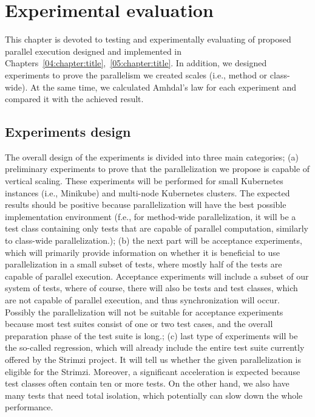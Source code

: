 \chapter{Experimental evaluation}
\label{06:chapter:title}

This chapter is devoted to testing and experimentally evaluating of proposed parallel execution designed and implemented in
Chapters~\ref{04:chapter:title},~\ref{05:chapter:title}.
In addition, we designed experiments to prove the parallelism we created scales (i.e., method or class-wide).
At the same time, we calculated Amhdal's law for each experiment and compared it with the achieved result.

\section{Experiments design}

The overall design of the experiments is divided into three main categories;
(a) preliminary experiments to prove that the parallelization we propose is capable of vertical scaling.
These experiments will be performed for small Kubernetes instances (i.e., Minikube) and multi-node Kubernetes clusters.
The expected results should be positive because parallelization will have the best possible implementation environment
(f.e., for method-wide parallelization, it will be a test class containing only tests that are capable of parallel computation,
similarly to class-wide parallelization.);
(b) the next part will be acceptance experiments, which will primarily provide information on whether it is beneficial
to use parallelization in a small subset of tests, where mostly half of the tests are capable of parallel execution.
Acceptance experiments will include a subset of our system of tests, where of course, there will also be tests and test classes,
which are not capable of parallel execution, and thus synchronization will occur.
Possibly the parallelization will not be suitable for acceptance experiments because most test suites consist of one or two test cases,
and the overall preparation phase of the test suite is long.;
(c) last type of experiments will be the so-called regression, which will already include the entire test suite currently offered by the Strimzi project.
It will tell us whether the given parallelization is eligible for the Strimzi.
Moreover, a significant acceleration is expected because test classes often contain ten or more tests.
On the other hand, we also have many tests that need total isolation, which potentially can slow down the whole performance.


